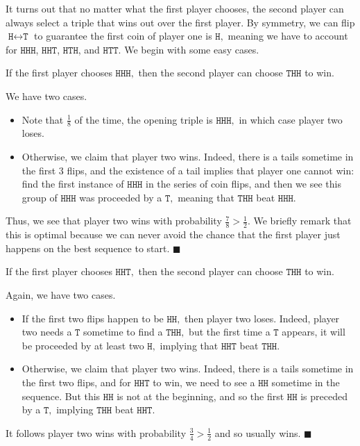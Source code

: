 It turns out that no matter what the first player chooses, the second player can always select a triple that wins out over the first player. By symmetry, we can flip $\texttt{H}\leftrightarrow\texttt{T}$ to guarantee the first coin of player one is $\texttt{H},$ meaning we have to account for $\texttt{HHH}$, $\texttt{HHT}$, $\texttt{HTH}$, and $\texttt{HTT}.$ We begin with some easy cases.
\begin{lemma}
    If the first player chooses $\texttt{HHH},$ then the second player can choose $\texttt{THH}$ to win.
\end{lemma}
We have two cases.
\begin{itemize}
    \item Note that $\frac18$ of the time, the opening triple is $\texttt{HHH},$ in which case player two loses.
    \item Otherwise, we claim that player two wins. Indeed, there is a tails sometime in the first $3$ flips, and the existence of a tail implies that player one cannot win: find the first instance of $\texttt{HHH}$ in the series of coin flips, and then we see this group of $\texttt{HHH}$ was proceeded by a $\texttt{T},$ meaning that $\texttt{THH}$ beat $\texttt{HHH}.$
\end{itemize}
Thus, we see that player two wins with probability $\frac78>\frac12.$ We briefly remark that this is optimal because we can never avoid the chance that the first player just happens on the best sequence to start. $\blacksquare$

\begin{lemma}
    If the first player chooses $\texttt{HHT},$ then the second player can choose $\texttt{THH}$ to win.
\end{lemma}
Again, we have two cases.
\begin{itemize}
    \item If the first two flips happen to be $\texttt{HH},$ then player two loses. Indeed, player two needs a $\texttt{T}$ sometime to find a $\texttt{THH},$ but the first time a $\texttt{T}$ appears, it will be proceeded by at least two $\texttt{H},$ implying that $\texttt{HHT}$ beat $\texttt{THH}.$
    \item Otherwise, we claim that player two wins. Indeed, there is a tails sometime in the first two flips, and for $\texttt{HHT}$ to win, we need to see a $\texttt{HH}$ sometime in the sequence. But this $\texttt{HH}$ is not at the beginning, and so the first $\texttt{HH}$ is preceded by a $\texttt{T},$ implying $\texttt{THH}$ beat $\texttt{HHT}.$
\end{itemize}
It follows player two wins with probability $\frac34>\frac12$ and so usually wins. $\blacksquare$

